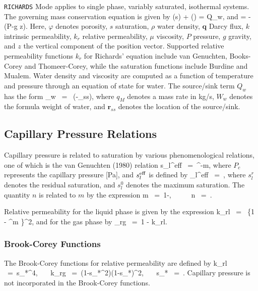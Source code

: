 \documentclass[12pt]{article}
\def\EQ#1\EN{\begin{equation}#1\end{equation}}
\newcommand{\eq}{\ =\ }
\newcommand{\p}{{\partial}}
\newcommand{\bnabla}{\boldsymbol{\nabla}}
\newcommand{\bq}{\boldsymbol{q}}
\newcommand{\br}{\boldsymbol{r}}
\begin{document}
{\tt RICHARDS} Mode applies to single phase, variably saturated, isothermal systems. The governing mass conservation equation is given by
\EQ
\frac{\p}{\p t}\left(\varphi s\rho\right) + \bnabla\cdot\left(\rho\bq\right) = Q_w,
\EN
and
\EQ
\bq = -\bnabla\left(P-\rho g z\right).
\EN
Here, $\varphi$ denotes porosity, $s$ saturation, $\rho$ water density, $\bq$ Darcy flux, $k$ intrinsic permeability, $k_r$ relative permeability, $\mu$ viscosity, $P$ pressure, $g$ gravity, and $z$ the vertical component of the position vector.  Supported relative permeability functions $k_r$ for Richards' equation include van Genuchten, Books-Corey and Thomeer-Corey, while the saturation functions include Burdine and Mualem.  Water density and viscosity are computed as a function of temperature and pressure through an equation of state for water. The source/sink term $Q_w$ has the form
\EQ
Q_w \eq {} \delta(\br-\br_{ss}),
\EN
where $q_M$ denotes a mass rate in kg/s, $W_w$ denotes the formula weight of water, and $\br_{ss}$ denotes the location of the source/sink.

\subsection{Capillary Pressure Relations}

Capillary pressure is related to saturation by various 
phenomenological relations, one of which is the van Genuchten 
(1980) relation 
\EQ\label{seff}
s_l^{\rm eff} \eq {}^{-m}, 
\EN 
where $P_c$ represents the capillary pressure [Pa], and $s_l^{\rm 
eff}$ is defined by 
\EQ 
s_l^{\rm eff} \eq {}, 
\EN 
where $s_l^r$ denotes the residual saturation, and $s_l^0$ denotes 
the maximum saturation. The quantity $n$ is related to $m$ by 
the expression 
\EQ\label{lambda} 
m \eq 1-, \ \ \ \ \ n \eq {}. 
\EN 
 
Relative permeability for the liquid phase is given by the expression \EQ\label{krl} 
k_{rl} \eq {} \left\{1 - ^m \right\}^2, 
\EN 
and for the gas phase by 
\EQ 
k_{rg} \eq 1 - k_{rl}. 
\EN 

\subsubsection{Brook-Corey Functions} 
 
The Brook-Corey functions for relative permeability are defined by  
\EQ\label{corey} 
k_{rl} \eq s_*^4, \ \ \ k_{rg} \eq (1-s_*^2)(1-s_*)^2, \ \ \ s_* 
\eq {}. 
\EN 
Capillary pressure is not incorporated in the Brook-Corey functions. 
 
\end{document}
